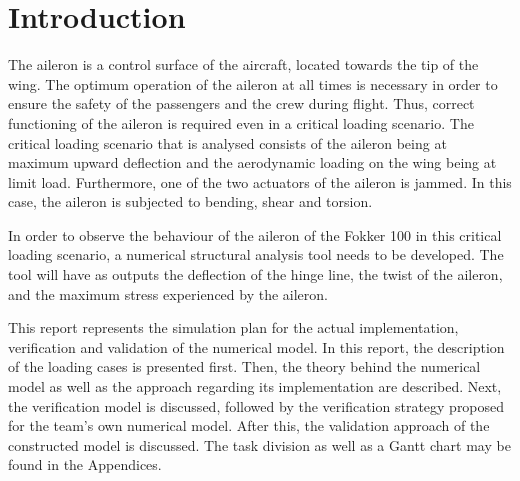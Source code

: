 \section{Introduction}
\label{Introduction}


The aileron is a control surface of the aircraft, located towards the tip of the wing. The optimum operation of the aileron at all times is necessary in order to ensure the safety of the passengers and the crew during flight. Thus, correct functioning of the aileron is required even in a critical loading scenario. 
The critical loading scenario that is analysed consists of the aileron being at maximum upward deflection and the aerodynamic loading on the
wing being at limit load. Furthermore, one of the two actuators of the aileron is jammed. In this case, the aileron is subjected to bending, shear and torsion. 

In order to observe the behaviour of the aileron of the Fokker 100 in this critical loading scenario, a numerical structural analysis tool needs to be developed. The tool will have as outputs the deflection of the hinge line, the twist of the aileron, and the maximum stress experienced by the aileron.

This report represents the simulation plan for the actual implementation, verification and validation of the numerical model. In this report, the description of the loading cases is presented first. Then, the theory behind the numerical model as well as the approach regarding its implementation are described. Next, the verification model is discussed, followed by the verification strategy proposed for the team's own numerical model. After this, the validation approach of the constructed model is discussed. The task division as well as a Gantt chart may be found in the Appendices.   
